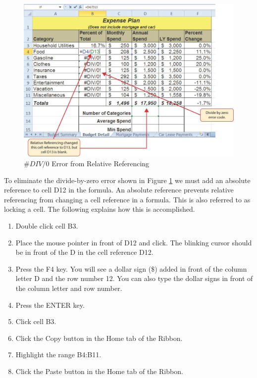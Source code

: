 \begin{figure}[H]
	\centering
	\includegraphics[width=\maxwidth{.95\linewidth}]{gfx/ch02_fig15}
	\caption{$ \#DIV/0 $ Error from Relative Referencing}
	\label{02:fig15}
\end{figure}

To eliminate the divide-by-zero error shown in Figure \ref{02:fig15} we must add an absolute reference to cell \textsf{D12} in the formula. An absolute reference prevents relative referencing from changing a cell reference in a formula. This is also referred to as locking a cell. The following explains how this is accomplished.

\begin{enumerate}
	\item Double click cell \textsf{B3}.
	\item Place the mouse pointer in front of \textsf{D12} and click. The blinking cursor should be in front of the D in the cell reference \textsf{D12}.
	\item Press the F4 key. You will see a dollar sign ($ \$ $) added in front of the column letter D and the row number 12. You can also type the dollar signs in front of the column letter and row number.
	\item Press the ENTER key.
	\item Click cell \textsf{B3}.
	\item Click the Copy button in the Home tab of the Ribbon.
	\item Highlight the range \textsf{B4:B11}.
	\item Click the Paste button in the Home tab of the Ribbon.
\end{enumerate}

